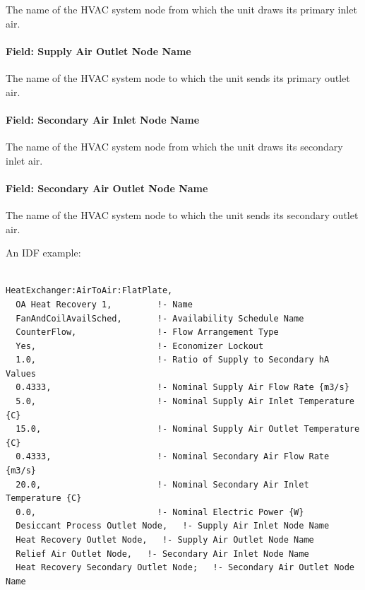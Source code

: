 The name of the HVAC system node from which the unit draws its primary inlet air.

\paragraph{Field: Supply Air Outlet Node Name}\label{field-supply-air-outlet-node-name-000}

The name of the HVAC system node to which the unit sends its primary outlet air.

\paragraph{Field: Secondary Air Inlet Node Name}\label{field-secondary-air-inlet-node-name-001}

The name of the HVAC system node from which the unit draws its secondary inlet air.

\paragraph{Field: Secondary Air Outlet Node Name}\label{field-secondary-air-outlet-node-name-000}

The name of the HVAC system node to which the unit sends its secondary outlet air.

An IDF example:

\begin{lstlisting}

HeatExchanger:AirToAir:FlatPlate,
  OA Heat Recovery 1,         !- Name
  FanAndCoilAvailSched,       !- Availability Schedule Name
  CounterFlow,                !- Flow Arrangement Type
  Yes,                        !- Economizer Lockout
  1.0,                        !- Ratio of Supply to Secondary hA Values
  0.4333,                     !- Nominal Supply Air Flow Rate {m3/s}
  5.0,                        !- Nominal Supply Air Inlet Temperature {C}
  15.0,                       !- Nominal Supply Air Outlet Temperature {C}
  0.4333,                     !- Nominal Secondary Air Flow Rate {m3/s}
  20.0,                       !- Nominal Secondary Air Inlet Temperature {C}
  0.0,                        !- Nominal Electric Power {W}
  Desiccant Process Outlet Node,   !- Supply Air Inlet Node Name
  Heat Recovery Outlet Node,   !- Supply Air Outlet Node Name
  Relief Air Outlet Node,   !- Secondary Air Inlet Node Name
  Heat Recovery Secondary Outlet Node;   !- Secondary Air Outlet Node Name
\end{lstlisting}

